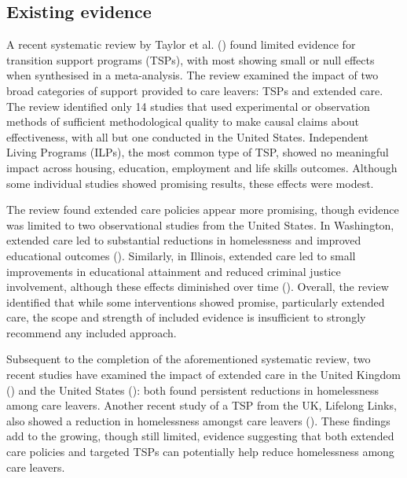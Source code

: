 \documentclass[
  jou,
  floatsintext,
  longtable,
  nolmodern,
  notxfonts,
  notimes,
  colorlinks=true,linkcolor=blue,citecolor=blue,urlcolor=blue]{apa7}
\begin{document}
\subsection{Existing evidence}\label{existing-evidence}

A recent systematic review by Taylor et al.
() found
limited evidence for transition support programs (TSPs), with most
showing small or null effects when synthesised in a meta-analysis. The
review examined the impact of two broad categories of support provided
to care leavers: TSPs and extended care. The review identified only 14
studies that used experimental or observation methods of sufficient
methodological quality to make causal claims about effectiveness, with
all but one conducted in the United States. Independent Living Programs
(ILPs), the most common type of TSP, showed no meaningful impact across
housing, education, employment and life skills outcomes. Although some
individual studies showed promising results, these effects were modest.

The review found extended care policies appear more promising, though
evidence was limited to two observational studies from the United
States. In Washington, extended care led to substantial reductions in
homelessness and improved educational outcomes
(). Similarly, in Illinois, extended care led to small improvements
in educational attainment and reduced criminal justice involvement,
although these effects diminished over time
(). Overall, the review identified that while some
interventions showed promise, particularly extended care, the scope and
strength of included evidence is insufficient to strongly recommend any
included approach.

Subsequent to the completion of the aforementioned systematic review,
two recent studies have examined the impact of extended care in the
United Kingdom
() and the United States
(): both found persistent reductions in
homelessness among care leavers. Another recent study of a TSP from the
UK, Lifelong Links, also showed a reduction in homelessness amongst care
leavers (). These findings add to the growing, though still limited,
evidence suggesting that both extended care policies and targeted TSPs
can potentially help reduce homelessness among care leavers.
\end{document}
